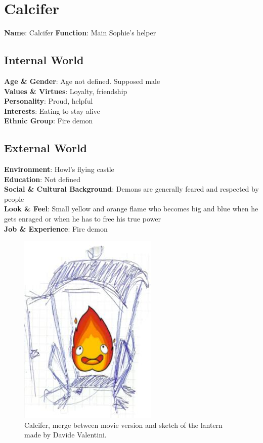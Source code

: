 \section{Calcifer}

\begin{minipage}{0.5\textwidth}
\textbf{Name}: Calcifer
\textbf{Function}: Main Sophie's helper

\subsection{Internal World}

\textbf{Age \& Gender}: Age not defined. Supposed male \\
\textbf{Values \& Virtues}: Loyalty, friendship\\
\textbf{Personality}: Proud, helpful \\
\textbf{Interests}: Eating to stay alive\\
\textbf{Ethnic Group}: Fire demon

\subsection{External World}
\textbf{Environment}: Howl’s flying castle \\
\textbf{Education}: Not defined \\
\textbf{Social \& Cultural Background}: Demons are generally feared and respected by people \\
\textbf{Look \& Feel}: Small yellow and orange flame who becomes big and  blue when he gets enraged or when he has to free his true power\\
\textbf{Job \& Experience}: Fire demon \\

\end{minipage}%
%
\hfill\begin{minipage}{0.4\textwidth}
  \begin{figure}[H]
    \includegraphics{Images/Characters/lantern}
    \caption{Calcifer, merge between movie version and sketch of the lantern made by Davide Valentini.}
\end{figure}
\end{minipage}

